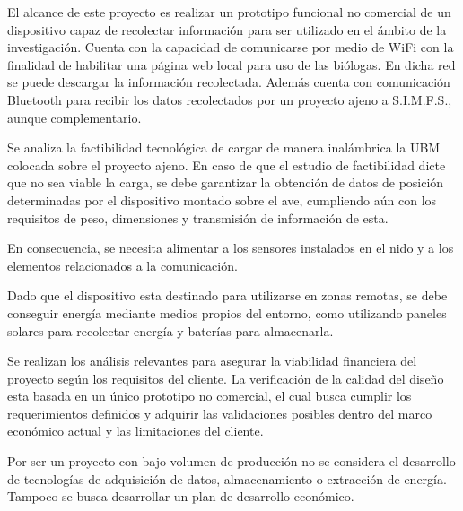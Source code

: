 El alcance de este proyecto es realizar un prototipo funcional no comercial de un dispositivo capaz de recolectar información para ser utilizado en el ámbito de la investigación. Cuenta con la capacidad de comunicarse por medio de WiFi con la finalidad de habilitar una página web local para uso de las biólogas. En dicha red se puede descargar la información recolectada. Además cuenta con comunicación Bluetooth para recibir los datos recolectados por un proyecto ajeno a S.I.M.F.S., aunque complementario.

Se analiza la factibilidad tecnológica de cargar de manera inalámbrica la UBM colocada sobre el proyecto ajeno. En caso de que el estudio de factibilidad dicte que no sea viable la carga, se debe garantizar la obtención de datos de posición determinadas por el dispositivo montado sobre el ave, cumpliendo aún con los requisitos de peso, dimensiones y transmisión de información de esta.

En consecuencia, se necesita alimentar a los sensores instalados en el nido y a los elementos relacionados a la comunicación.

Dado que el dispositivo esta destinado para utilizarse en zonas remotas, se debe conseguir energía mediante medios propios del entorno, como utilizando paneles solares para recolectar energía y baterías para almacenarla.

Se realizan los análisis relevantes para asegurar la viabilidad financiera del proyecto según los requisitos del cliente. La verificación de la calidad del diseño esta basada en un único prototipo no comercial, el cual busca cumplir los requerimientos definidos y adquirir las validaciones posibles dentro del marco económico actual y las limitaciones del cliente. 

Por ser un proyecto con bajo volumen de producción no se considera el desarrollo de tecnologías de adquisición de datos, almacenamiento o extracción de energía. Tampoco se busca desarrollar un plan de desarrollo económico.